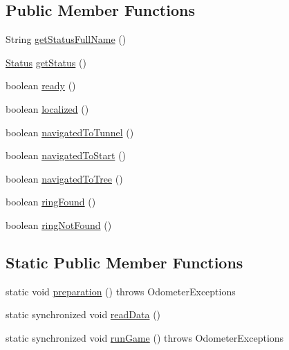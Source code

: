\subsection*{Public Member Functions}
\begin{DoxyCompactItemize}
\item 
String \hyperlink{enumca_1_1mcgill_1_1ecse211_1_1project_1_1_game_a43a5763d183e0bcacd402c872c07273e}{get\+Status\+Full\+Name} ()
\item 
\hyperlink{enumca_1_1mcgill_1_1ecse211_1_1project_1_1_game_1_1_status}{Status} \hyperlink{enumca_1_1mcgill_1_1ecse211_1_1project_1_1_game_a620374b3eeb3dd7e0abd26f3ced9053b}{get\+Status} ()
\item 
boolean \hyperlink{enumca_1_1mcgill_1_1ecse211_1_1project_1_1_game_af0afcc3fad6172857252b89624f48e32}{ready} ()
\item 
boolean \hyperlink{enumca_1_1mcgill_1_1ecse211_1_1project_1_1_game_a6b4c0cfb8de83ba7c6d5dfb24882dc5a}{localized} ()
\item 
boolean \hyperlink{enumca_1_1mcgill_1_1ecse211_1_1project_1_1_game_affc3685219c09f0a4a75cb1ea9366c8e}{navigated\+To\+Tunnel} ()
\item 
boolean \hyperlink{enumca_1_1mcgill_1_1ecse211_1_1project_1_1_game_a5f387482790bf2c55413a6619b4d00d8}{navigated\+To\+Start} ()
\item 
boolean \hyperlink{enumca_1_1mcgill_1_1ecse211_1_1project_1_1_game_aed641f9ade50f0090096a46d90588eb7}{navigated\+To\+Tree} ()
\item 
boolean \hyperlink{enumca_1_1mcgill_1_1ecse211_1_1project_1_1_game_a62d510506f1b829fe67dea7270e5b889}{ring\+Found} ()
\item 
boolean \hyperlink{enumca_1_1mcgill_1_1ecse211_1_1project_1_1_game_adc2725f291b0688a62f85db1df1ee2b2}{ring\+Not\+Found} ()
\end{DoxyCompactItemize}
\subsection*{Static Public Member Functions}
\begin{DoxyCompactItemize}
\item 
static void \hyperlink{enumca_1_1mcgill_1_1ecse211_1_1project_1_1_game_a1bcbd1c19309c65a6887ae19bde66765}{preparation} ()  throws Odometer\+Exceptions 
\item 
static synchronized void \hyperlink{enumca_1_1mcgill_1_1ecse211_1_1project_1_1_game_aff9431d27d78c8b228f468d8ad889a9a}{read\+Data} ()
\item 
static synchronized void \hyperlink{enumca_1_1mcgill_1_1ecse211_1_1project_1_1_game_a790740a4ed299c9b985401ea8c4d5010}{run\+Game} ()  throws Odometer\+Exceptions 
\end{DoxyCompactItemize}
